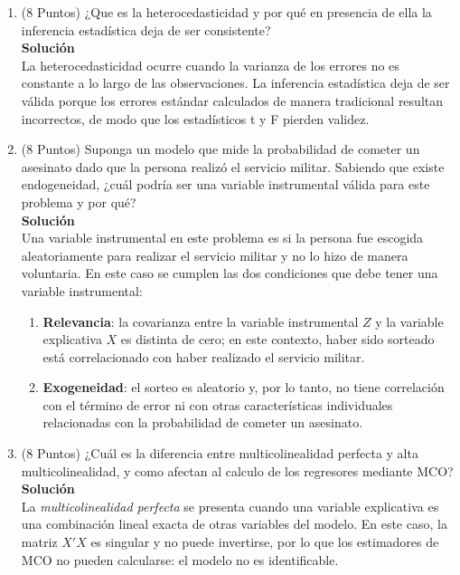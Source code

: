 \documentclass[10pt,a4paper]{article}
\begin{document}
\begin{enumerate}

\item (8 Puntos) ¿Que es la heterocedasticidad y por qué en presencia de ella la inferencia estadística deja de ser consistente?
\\
\textbf{Solución}
\\
La heterocedasticidad ocurre cuando la varianza de los errores no es constante a lo largo de las observaciones. La inferencia estadística deja de ser válida porque los errores estándar calculados de manera tradicional resultan incorrectos, de modo que los estadísticos t y F pierden validez.

\item (8 Puntos) Suponga un modelo que mide la probabilidad de cometer un asesinato dado que la persona realizó el servicio militar. Sabiendo que existe endogeneidad, ¿cuál podría ser una variable instrumental válida para este problema y por qué? \\
\textbf{Solución} 
\\

Una variable instrumental en este problema es si la persona fue escogida aleatoriamente para realizar el servicio militar y no lo hizo de manera voluntaria. En este caso se cumplen las dos condiciones que debe tener una variable instrumental: 

\begin{enumerate}
    \item \textbf{Relevancia}: la covarianza entre la variable instrumental $Z$ y la variable explicativa $X$ es distinta de cero; en este contexto, haber sido sorteado está correlacionado con haber realizado el servicio militar. 
    \item \textbf{Exogeneidad}: el sorteo es aleatorio y, por lo tanto, no tiene correlación con el término de error ni con otras características individuales relacionadas con la probabilidad de cometer un asesinato.
\end{enumerate}


\item (8 Puntos) ¿Cuál es la diferencia entre multicolinealidad perfecta y alta multicolinealidad, y como afectan al calculo de los regresores mediante MCO?\\
\textbf{Solución}
\\
La \textit{multicolinealidad perfecta} se presenta cuando una variable explicativa es una combinación lineal exacta de otras variables del modelo. En este caso, la matriz $X'X$ es singular y no puede invertirse, por lo que los estimadores de MCO no pueden calcularse: el modelo no es identificable.  


\end{enumerate}
\end{document}
